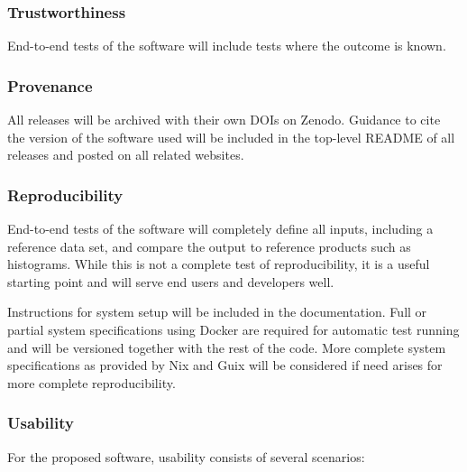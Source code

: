 
\subsubsection*{Trustworthiness}
End-to-end tests of the software will include tests where the outcome is known.

\subsubsection*{Provenance}
All releases will be archived with their own DOIs on Zenodo.  Guidance to cite the version of the software used will be included in the top-level README of all releases and posted on all related websites.

\subsubsection*{Reproducibility}
End-to-end tests of the software will completely define all inputs, including a reference data set, and compare the output to reference products such as histograms.  While this is not a complete test of reproducibility, it is a useful starting point and will serve end users and developers well.  

Instructions for system setup will be included in the documentation.  Full or partial system specifications using Docker are required for automatic test running and will be versioned together with the rest of the code.  More complete system specifications as provided by Nix and Guix will be considered if need arises for more complete reproducibility.

\subsubsection*{Usability}
For the proposed software, usability consists of several scenarios:


